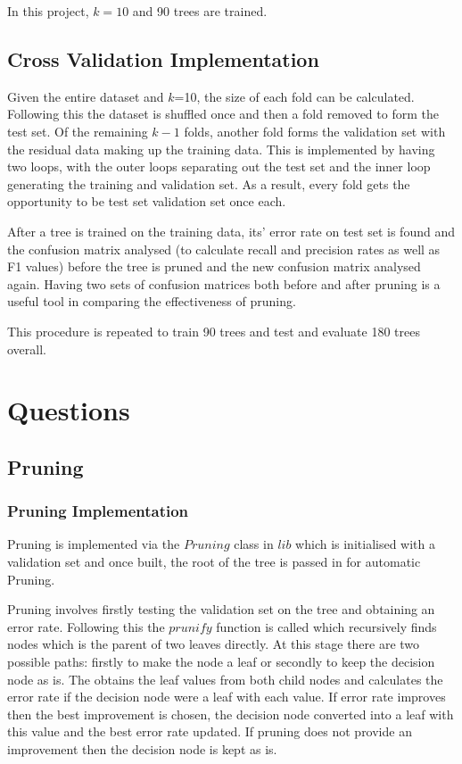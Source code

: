 \documentclass{article}
\begin{document}
In this project, $k=10$ and 90 trees are trained.

\subsection{Cross Validation Implementation}

Given the entire dataset and $k$=10, the size of each fold can be calculated. Following this the dataset is shuffled once and then a fold removed to form the test set. Of the remaining $k-1$ folds, another fold forms the validation set with the residual data making up the training data. This is implemented by having two loops, with the outer loops separating out the test set and the inner loop generating the training and validation set. As a result, every fold gets the opportunity to be test set validation set once each.

After a tree is trained on the training data, its' error rate on test set is found and the confusion matrix analysed (to calculate recall and precision rates as well as F1 values) before the tree is pruned and the new confusion matrix analysed again. Having two sets of confusion matrices both before and after pruning is a useful tool in comparing the effectiveness of pruning.

This procedure is repeated to train 90 trees and test and evaluate 180 trees overall.



\section{Questions}

\subsection{Pruning}

\subsubsection{Pruning Implementation}

Pruning is implemented via the $Pruning$ class in $lib$ which is initialised with a validation set and once built, the root of the tree is passed in for automatic Pruning.

Pruning involves firstly testing the validation set on the tree and obtaining an error rate. Following this the $prunify$ function is called which recursively finds nodes which is the parent of two leaves directly. At this stage there are two possible paths: firstly to make the node a leaf or secondly to keep the decision node as is. The obtains the leaf values from both child nodes and calculates the error rate if the decision node were a leaf with each value. If error rate improves then the best improvement is chosen, the decision node converted into a leaf with this value and the best error rate updated. If pruning does not provide an improvement then the decision node is kept as is.
\end{document}
